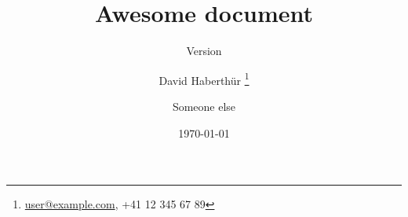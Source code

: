 \documentclass[paper=a4,twoside=true,DIV=calc]{scrartcl}
\title{Awesome document}
\subtitle{Version \gitAbbrevHash}
\author{David Haberthür%
	\thanks{\href{mailto:user@example.com}{user@example.com}, +41 12 345 67 89}%
	\and%
	Someone else%
	}
\date{\today}
\begin{document}
\maketitle

\blinddocument

\printbibliography
\end{document}
